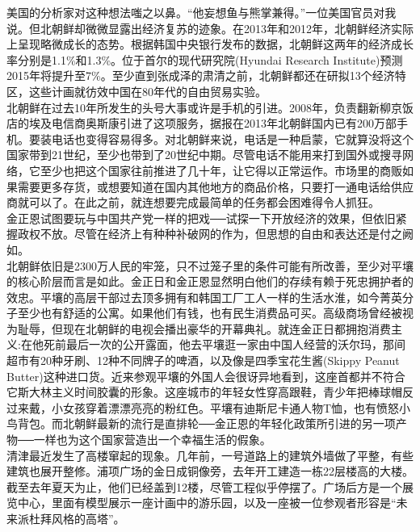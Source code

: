 美国的分析家对这种想法嗤之以鼻。“他妄想鱼与熊掌兼得。”一位美国官员对我说。但北朝鲜却微微显露出经济复苏的迹象。在2013年和2012年，北朝鲜经济实际上呈现略微成长的态势。根据韩国中央银行发布的数据，北朝鲜这两年的经济成长率分别是1.1\%和1.3\%。位于首尔的现代研究院(Hyundai Research Institute)预测2015年将提升至7\%。至少直到张成泽的肃清之前，北朝鲜都还在研拟13个经济特区，这些计画就彷效中国在80年代的自由贸易实验。\\

北朝鲜在过去10年所发生的头号大事或许是手机的引进。2008年，负责翻新柳京饭店的埃及电信商奥斯康引进了这项服务，据报在2013年北朝鲜国内已有200万部手机。要装电话也变得容易得多。对北朝鲜来说，电话是一种启蒙，它就算没将这个国家带到21世纪，至少也带到了20世纪中期。尽管电话不能用来打到国外或搜寻网络，它至少也把这个国家往前推进了几十年，让它得以正常运作。市场里的商贩如果需要更多存货，或想要知道在国内其他地方的商品价格，只要打一通电话给供应商就可以了。在此之前，就连想要完成最简单的任务都会困难得令人抓狂。\\

金正恩试图要玩与中国共产党一样的把戏──试探一下开放经济的效果，但依旧紧握政权不放。尽管在经济上有种种补破网的作为，但思想的自由和表达还是付之阙如。\\

北朝鲜依旧是2300万人民的牢笼，只不过笼子里的条件可能有所改善，至少对平壤的核心阶层而言是如此。金正日和金正恩显然明白他们的存续有赖于死忠拥护者的效忠。平壤的高层干部过去顶多拥有和韩国工厂工人一样的生活水淮，如今菁英分子至少也有舒适的公寓。如果他们有钱，也有民生消费品可买。高级商场曾经被视为耻辱，但现在北朝鲜的电视会播出豪华的开幕典礼。就连金正日都拥抱消费主义:在他死前最后一次的公开露面，他去平壤逛一家由中国人经营的沃尔玛，那间超市有20种牙刷、12种不同牌子的啤酒，以及像是四季宝花生酱(Skippy Peanut Butter)这种进口货。近来参观平壤的外国人会很讶异地看到，这座首都并不符合它斯大林主义时间胶囊的形象。这座城市的年轻女性穿高跟鞋，青少年把棒球帽反过来戴，小女孩穿着漂漂亮亮的粉红色。平壤有迪斯尼卡通人物T恤，也有愤怒小鸟背包。而北朝鲜最新的流行是直排轮──金正恩的年轻化政策所引进的另一项产物──一样也为这个国家营造出一个幸福生活的假象。\\

清津最近发生了高楼窜起的现象。几年前，一号道路上的建筑外墙做了平整，有些建筑也展开整修。浦项广场的金日成铜像旁，去年开工建造一栋22层楼高的大楼。截至去年夏天为止，他们已经盖到12楼，尽管工程似乎停摆了。广场后方是一个展览中心，里面有模型展示一座计画中的游乐园，以及一座被一位参观者形容是“未来派杜拜风格的高塔”。\\

